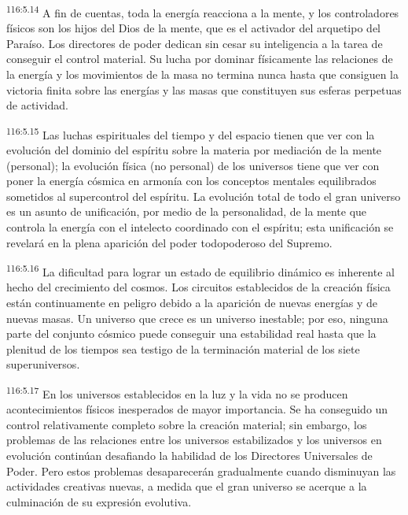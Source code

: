 \par
\textsuperscript{116:5.14} A fin de cuentas, toda la energía reacciona a la mente, y los controladores físicos son los hijos del Dios de la mente, que es el activador del arquetipo del Paraíso. Los directores de poder dedican sin cesar su inteligencia a la tarea de conseguir el control material. Su lucha por dominar físicamente las relaciones de la energía y los movimientos de la masa no termina nunca hasta que consiguen la victoria finita sobre las energías y las masas que constituyen sus esferas perpetuas de actividad.

\par
\textsuperscript{116:5.15} Las luchas espirituales del tiempo y del espacio tienen que ver con la evolución del dominio del espíritu sobre la materia por mediación de la mente (personal); la evolución física (no personal) de los universos tiene que ver con poner la energía cósmica en armonía con los conceptos mentales equilibrados sometidos al supercontrol del espíritu. La evolución total de todo el gran universo es un asunto de unificación, por medio de la personalidad, de la mente que controla la energía con el intelecto coordinado con el espíritu; esta unificación se revelará en la plena aparición del poder todopoderoso del Supremo.

\par
\textsuperscript{116:5.16} La dificultad para lograr un estado de equilibrio dinámico es inherente al hecho del crecimiento del cosmos. Los circuitos establecidos de la creación física están continuamente en peligro debido a la aparición de nuevas energías y de nuevas masas. Un universo que crece es un universo inestable; por eso, ninguna parte del conjunto cósmico puede conseguir una estabilidad real hasta que la plenitud de los tiempos sea testigo de la terminación material de los siete superuniversos.

\par
\textsuperscript{116:5.17} En los universos establecidos en la luz y la vida no se producen acontecimientos físicos inesperados de mayor importancia. Se ha conseguido un control relativamente completo sobre la creación material; sin embargo, los problemas de las relaciones entre los universos estabilizados y los universos en evolución continúan desafiando la habilidad de los Directores Universales de Poder. Pero estos problemas desaparecerán gradualmente cuando disminuyan las actividades creativas nuevas, a medida que el gran universo se acerque a la culminación de su expresión evolutiva.

